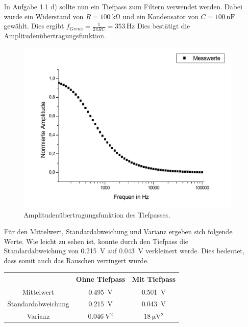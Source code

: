 \documentclass{article}						%
\begin{document}
		In Aufgabe 1.1 d) sollte nun ein Tiefpass zum Filtern verwendet werden. Dabei wurde ein Widerstand von $  R = \SI{100}{\kilo\ohm} $ und ein Kondensator von $  C = \SI{100}{\nano\farad} $ gewählt. Dies ergibt $  f_{Grenz} = \frac{1}{2\pi RC} = \SI{353}{\hertz} $ Dies bestätigt die Amplitudenübertragungsfunktion. 
		
		\begin{figure}[h!]
			\centering
			\includegraphics[scale=0.25]{Amplitudenuebertragungsfunktion}
			\caption{Amplitudenübertragungsfunktion des Tiefpasses.}
		\end{figure}
		
		Für den Mittelwert, Standardabweichung und Varianz ergeben sich folgende Werte. Wie leicht zu sehen ist, konnte durch den Tiefpass die Standardabweichung von \SI{0,215}{\volt} auf \SI{0,043}{\volt} verkleinert werde. Dies bedeutet, dass somit auch das Rauschen verringert wurde.
		\begin{center}
			\begin{tabular}{|c|c|c|}
			\hline  & Ohne Tiefpass & Mit Tiefpass \\ 
			\hline Mittelwert & \SI{0,495}{\volt} & \SI{0,501}{\volt} \\ 
			\hline Standardabweichung & \SI{0,215}{\volt} & \SI{0,043}{\volt} \\ 
			\hline Varianz & $ \SI{0,046}{\volt^2} $ & $ \SI{18}{\micro\volt^2} $ \\ 
			\hline 
			\end{tabular} 
		\end{center}
\end{document}
